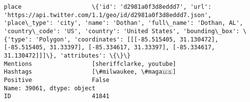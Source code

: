 \documentclass[11pt]{article}
\begin{document}
\begin{Verbatim}[commandchars=\\\{\}]
place                    \{'id': 'd2981a0f3d8eddd7', 'url': 'https://api.twitter.com/1.1/geo/id/d2981a0f3d8eddd7.json', 'place\_type': 'city', 'name': 'Dothan', 'full\_name': 'Dothan, AL', 'country\_code': 'US', 'country': 'United States', 'bounding\_box': \{'type': 'Polygon', 'coordinates': [[[-85.515405, 31.130472], [-85.515405, 31.33397], [-85.334617, 31.33397], [-85.334617, 31.130472]]]\}, 'attributes': \{\}\}                                                                                                                                                                         
Mentions                 [sheriffclarke, youtube]                                                                                                                                                                                                                                                                                                                                                                                                                                                                                                                                               
Hashtags                 [\#milwaukee, \#maga🇺🇸]                                                                                                                                                                                                                                                                                                                                                                                                                                                                                                                                                  
Positive                 False                                                                                                                                                                                                                                                                                                                                                                                                                                                                                                                                                                  
Name: 39061, dtype: object
ID                       41841                                                                                                                                                                                                                                                                                                                                                                                           

\end{Verbatim}
\end{document}
